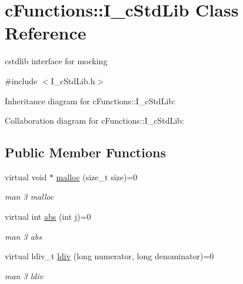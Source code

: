 \hypertarget{classcFunctions_1_1I__cStdLib}{}\section{c\+Functions\+::I\+\_\+c\+Std\+Lib Class Reference}
\label{classcFunctions_1_1I__cStdLib}


cstdlib interface for mocking  




{\ttfamily \#include $<$I\+\_\+c\+Std\+Lib.\+h$>$}



Inheritance diagram for c\+Functions\+::I\+\_\+c\+Std\+Lib\+:


Collaboration diagram for c\+Functions\+::I\+\_\+c\+Std\+Lib\+:
\subsection*{Public Member Functions}
\begin{DoxyCompactItemize}
\item 
\mbox{\label{classcFunctions_1_1I__cStdLib_acd2f169108db9e7c21e343fd0b02ad46}} 
virtual void $\ast$ \mbox{\hyperlink{classcFunctions_1_1I__cStdLib_acd2f169108db9e7c21e343fd0b02ad46}{malloc}} (size\+\_\+t size)=0
\begin{DoxyCompactList}\small\item\em man 3 malloc \end{DoxyCompactList}\item 
\mbox{\label{classcFunctions_1_1I__cStdLib_a925edeff17b03114220b1ff8130d1385}} 
virtual int \mbox{\hyperlink{classcFunctions_1_1I__cStdLib_a925edeff17b03114220b1ff8130d1385}{abs}} (int j)=0
\begin{DoxyCompactList}\small\item\em man 3 abs \end{DoxyCompactList}\item 
\mbox{\label{classcFunctions_1_1I__cStdLib_a07ea051ed0e65d96824be88995a9d628}} 
virtual ldiv\+\_\+t \mbox{\hyperlink{classcFunctions_1_1I__cStdLib_a07ea051ed0e65d96824be88995a9d628}{ldiv}} (long numerator, long denominator)=0
\begin{DoxyCompactList}\small\item\em man 3 ldiv \end{DoxyCompactList}\end{DoxyCompactItemize}


